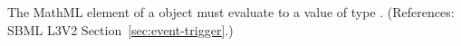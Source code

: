 The MathML  element of a \Trigger object must evaluate to a
value of type .  (References: SBML L3V2
Section~\ref{sec:event-trigger}.)
